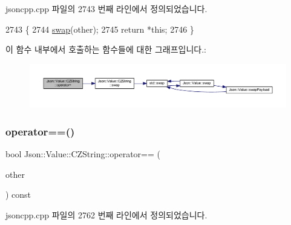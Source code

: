 jsoncpp.\+cpp 파일의 2743 번째 라인에서 정의되었습니다.


\begin{DoxyCode}
2743                                                       \{
2744   \hyperlink{class_json_1_1_value_1_1_c_z_string_ad59f3542d2eea749a6a63409d1a02207}{swap}(other);
2745   \textcolor{keywordflow}{return} *\textcolor{keyword}{this};
2746 \}
\end{DoxyCode}
이 함수 내부에서 호출하는 함수들에 대한 그래프입니다.\+:\nopagebreak
\begin{figure}[H]
\begin{center}
\leavevmode
\includegraphics[width=350pt]{class_json_1_1_value_1_1_c_z_string_a6513ff431b0593d5744868dfee739f7b_cgraph}
\end{center}
\end{figure}
\mbox{\label{class_json_1_1_value_1_1_c_z_string_ad41766c98fc6a6d5fcd72aaf78fc5db0}} 
\subsubsection{\texorpdfstring{operator==()}{operator==()}}
{\footnotesize\ttfamily bool Json\+::\+Value\+::\+C\+Z\+String\+::operator== (\begin{DoxyParamCaption}\item[{\hyperlink{class_json_1_1_value_1_1_c_z_string}{C\+Z\+String} const \&}]{other }\end{DoxyParamCaption}) const}



jsoncpp.\+cpp 파일의 2762 번째 라인에서 정의되었습니다.


